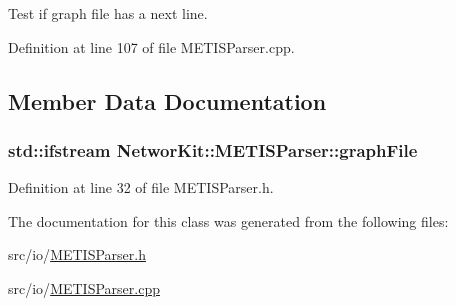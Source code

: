 Test if graph file has a next line. 



Definition at line 107 of file M\-E\-T\-I\-S\-Parser.\-cpp.



\subsection{Member Data Documentation}
\hypertarget{class_networ_kit_1_1_m_e_t_i_s_parser_ad4b045bd37a450efdedb2918023de55c}{
\subsubsection[{graph\-File}]{\setlength{\rightskip}{0pt plus 5cm}std\-::ifstream Networ\-Kit\-::\-M\-E\-T\-I\-S\-Parser\-::graph\-File\hspace{0.3cm}{\ttfamily [protected]}}}\label{class_networ_kit_1_1_m_e_t_i_s_parser_ad4b045bd37a450efdedb2918023de55c}


Definition at line 32 of file M\-E\-T\-I\-S\-Parser.\-h.



The documentation for this class was generated from the following files\-:\begin{DoxyCompactItemize}
\item 
src/io/\hyperlink{_m_e_t_i_s_parser_8h}{M\-E\-T\-I\-S\-Parser.\-h}\item 
src/io/\hyperlink{_m_e_t_i_s_parser_8cpp}{M\-E\-T\-I\-S\-Parser.\-cpp}\end{DoxyCompactItemize}
